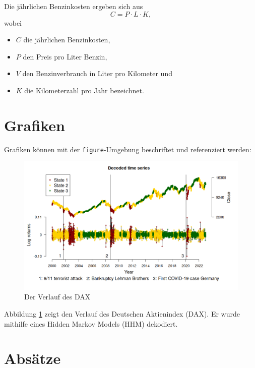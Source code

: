 \documentclass{article}
\begin{document}
Die jährlichen Benzinkosten ergeben sich aus $$ C = P \cdot L \cdot K, $$ wobei

\begin{itemize}
    \item $C$ die jährlichen Benzinkosten,
    \item $P$ den Preis pro Liter Benzin,
    \item $V$ den Benzinverbrauch in Liter pro Kilometer und
    \item $K$ die Kilometerzahl pro Jahr bezeichnet.
\end{itemize}

\section{Grafiken}

Grafiken können mit der \texttt{figure}-Umgebung beschriftet und referenziert werden:

\begin{figure}[ht] %
    \centering
    \includegraphics[width = \textwidth]{time_series.png}
    \caption{Der Verlauf des DAX}
    \label{fig:dax}
\end{figure}

Abbildung \ref{fig:dax} zeigt den Verlauf des Deutschen Aktienindex (DAX). Er wurde mithilfe eines Hidden Markov Models (HHM) dekodiert.

\section{Absätze}
\end{document}
